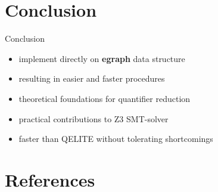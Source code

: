 \documentclass{beamer}
\begin{document}
\section{Conclusion}

\begin{frame}{Conclusion}

\begin{itemize}
    \item implement directly on \textbf{egraph} data structure
    \pause
    \item resulting in easier and faster procedures
    \pause
    \item theoretical foundations for quantifier reduction
    \pause
    \item practical contributions to Z3 SMT-solver
    \pause
    \item faster than QELITE without tolerating shortcomings
\end{itemize}

\end{frame}

\section{References}

\begin{frame}[t,allowframebreaks]
    \printbibliography
\end{frame}
\end{document}
